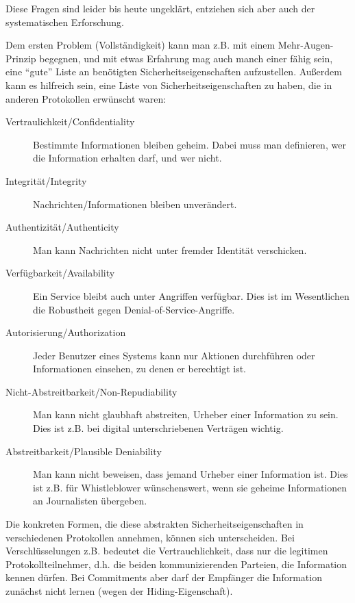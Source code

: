Diese Fragen sind leider bis heute ungeklärt, entziehen sich aber auch der systematischen Erforschung.

Dem ersten Problem (Vollständigkeit) kann man z.B. mit einem Mehr-Augen-Prinzip begegnen, und mit etwas Erfahrung mag auch manch einer fähig sein, eine "`gute"' Liste an benötigten Sicherheitseigenschaften aufzustellen.
Außerdem kann es hilfreich sein, eine Liste von Sicherheitseigenschaften zu haben, die in anderen Protokollen erwünscht waren:

\begin{description}
	\item[Vertraulichkeit/Confidentiality] Bestimmte Informationen bleiben geheim. Dabei muss man definieren, wer die Information erhalten darf, und wer nicht.
	\item[Integrität/Integrity] Nachrichten/Informationen bleiben unverändert.
	\item[Authentizität/Authenticity]
          Man kann Nachrichten nicht unter fremder Identität verschicken.
	\item[Verfügbarkeit/Availability]
           Ein Service bleibt auch unter Angriffen verfügbar. Dies ist im Wesentlichen die Robustheit gegen Denial-of-Service-Angriffe.
	\item[Autorisierung/Authorization]Jeder Benutzer eines Systems kann nur Aktionen durchführen oder Informationen einsehen, zu denen er berechtigt ist.
	\item[Nicht-Abstreitbarkeit/Non-Repudiability] Man kann nicht glaubhaft abstreiten, Urheber einer Information zu sein. Dies ist z.B. bei digital unterschriebenen Verträgen wichtig.
	\item[Abstreitbarkeit/Plausible Deniability]
          Man kann nicht beweisen, dass jemand Urheber einer Information ist. Dies ist z.B. für Whistleblower wünschenswert, wenn sie geheime Informationen an Journalisten übergeben.
\end{description}

Die konkreten Formen, die diese abstrakten Sicherheitseigenschaften in verschiedenen Protokollen annehmen, können sich unterscheiden.
Bei Verschlüsselungen z.B. bedeutet die Vertrauchlichkeit, dass nur die legitimen Protokollteilnehmer, d.h. die beiden kommunizierenden Parteien, die Information kennen dürfen.
Bei Commitments aber darf der Empfänger die Information zunächst nicht lernen (wegen der Hiding-Eigenschaft).

